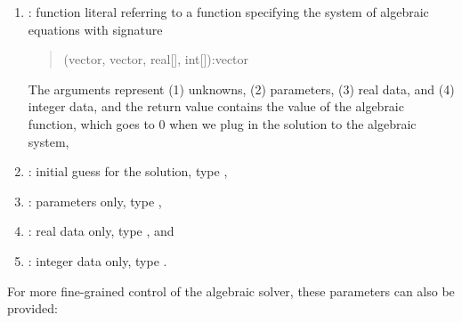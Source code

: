 \begin{description}
\begin{description}
\begin{description}
\begin{description}
\begin{description}
\begin{description}
\begin{description}
\begin{description}
\begin{description}
\begin{description}
\begin{description}
\begin{description}
\begin{description}
\begin{description}
\begin{description}
\begin{description}
\begin{description}
\begin{description}
\begin{description}
\begin{description}
\begin{description}
\begin{description}
\begin{description}
\begin{description}
\begin{description}
\begin{description}
\begin{description}
\begin{description}
\begin{description}
\begin{description}
\begin{description}
\begin{description}
\begin{description}
\begin{description}
\begin{description}
\begin{description}
\begin{description}
\begin{description}
\begin{description}
\begin{description}
\begin{description}
\begin{description}
\begin{description}
\begin{description}
\begin{description}
\begin{description}
\begin{description}
\begin{description}
\begin{description}
\begin{description}
\begin{description}
\begin{description}
\begin{description}
\begin{description}
\begin{description}
\begin{description}
\begin{description}
\begin{description}
\begin{description}
\begin{description}
\begin{description}
\begin{description}
\begin{description}
\begin{description}
\begin{description}
\begin{description}
\begin{description}
\begin{description}
\begin{description}
\begin{description}
\begin{description}
\begin{description}
\begin{description}
\begin{description}
\begin{description}
\begin{description}
\begin{description}
\begin{description}
\begin{description}
\begin{description}
\begin{description}
\begin{description}
\begin{enumerate} \item {}: function literal referring to a function   specifying the system of algebraic equations with signature   \begin{quote}     (vector, vector, real[], int[]):vector   \end{quote}   The arguments represent (1) unknowns, (2) parameters, (3) real data, and   (4) integer data, and the return value contains the value of the algebraic   function, which goes to 0 when we plug in the solution to the algebraic system, \item {}: initial guess for the solution, type , \item {}: parameters only, type , \item {}: real data only, type , and \item {}: integer data only, type . \end{enumerate}

For more fine-grained control of the algebraic solver, these parameters can also be provided: %
\end{description}
\end{description}
\end{description}
\end{description}
\end{description}
\end{description}
\end{description}
\end{description}
\end{description}
\end{description}
\end{description}
\end{description}
\end{description}
\end{description}
\end{description}
\end{description}
\end{description}
\end{description}
\end{description}
\end{description}
\end{description}
\end{description}
\end{description}
\end{description}
\end{description}
\end{description}
\end{description}
\end{description}
\end{description}
\end{description}
\end{description}
\end{description}
\end{description}
\end{description}
\end{description}
\end{description}
\end{description}
\end{description}
\end{description}
\end{description}
\end{description}
\end{description}
\end{description}
\end{description}
\end{description}
\end{description}
\end{description}
\end{description}
\end{description}
\end{description}
\end{description}
\end{description}
\end{description}
\end{description}
\end{description}
\end{description}
\end{description}
\end{description}
\end{description}
\end{description}
\end{description}
\end{description}
\end{description}
\end{description}
\end{description}
\end{description}
\end{description}
\end{description}
\end{description}
\end{description}
\end{description}
\end{description}
\end{description}
\end{description}
\end{description}
\end{description}
\end{description}
\end{description}
\end{description}
\end{description}
\end{description}
\end{description}
